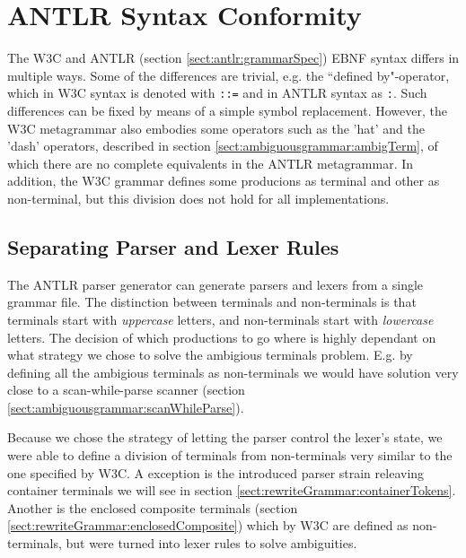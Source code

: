 \section{ANTLR Syntax Conformity}
The W3C\cite{w3c00} and ANTLR (section \ref{sect:antlr:grammarSpec}) EBNF syntax differs in multiple ways. Some of the differences are trivial, e.g. the ``defined by"-operator, which in W3C syntax is denoted with \verb!::=! and in ANTLR syntax as \verb!:!. Such differences can be fixed by means of a simple symbol replacement. However, the W3C metagrammar also embodies some operators such as the 'hat' and the 'dash' operators, described in section \ref{sect:ambiguousgrammar:ambigTerm}, of which there are no complete equivalents in the ANTLR metagrammar. In addition, the W3C grammar defines some producions as terminal and other as non-terminal, but this division does not hold for all implementations.

\subsection{Separating Parser and Lexer Rules}
\label{sect:implementation:separate}
The ANTLR parser generator can generate parsers and lexers from a single grammar file. The distinction between terminals and non-terminals is that terminals start with \emph{uppercase} letters, and non-terminals start with \emph{lowercase} letters. The decision of which productions to go where is highly dependant on what strategy we chose to solve the ambigious terminals problem. E.g. by defining all the ambigious terminals as non-terminals we would have solution very close to a scan-while-parse scanner (section \ref{sect:ambiguousgrammar:scanWhileParse}). 

Because we chose the strategy of letting the parser control the lexer's state, we were able to define a division of terminals from non-terminals very similar to the one specified by W3C. A exception is the introduced parser strain releaving container terminals we will see in section \ref{sect:rewriteGrammar:containerTokens}. Another is the enclosed composite terminals (section \ref{sect:rewriteGrammar:enclosedComposite}) which by W3C are defined as non-terminals, but were turned into lexer rules to solve ambiguities.

